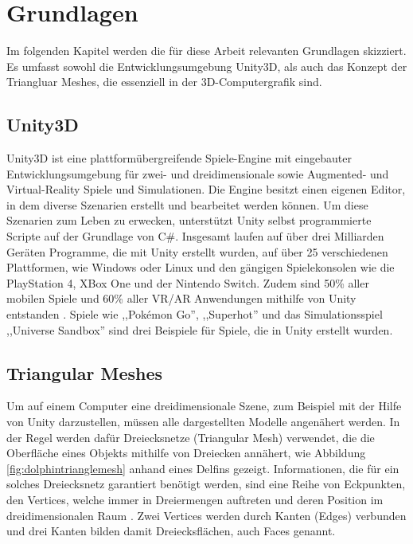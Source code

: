 \section{Grundlagen}
Im folgenden Kapitel werden die f\"ur diese Arbeit relevanten Grundlagen skizziert. Es umfasst sowohl die Entwicklungsumgebung Unity3D, als auch das Konzept der Triangluar Meshes, die essenziell in der 3D-Computergrafik sind.

\subsection{Unity3D}
Unity3D ist eine plattform\"ubergreifende Spiele-Engine mit eingebauter Entwicklungsumgebung f\"ur zwei- und dreidimensionale sowie Augmented- und Virtual-Reality Spiele und Simulationen. Die Engine besitzt einen eigenen Editor, in dem diverse Szenarien erstellt und bearbeitet werden k\"onnen. Um diese Szenarien zum Leben zu erwecken, unterst\"utzt Unity selbst programmierte Scripte auf der Grundlage von C\#. Insgesamt laufen auf \"uber drei Milliarden Ger\"aten Programme, die mit Unity erstellt wurden, auf \"uber 25 verschiedenen Plattformen, wie Windows oder Linux und den g\"angigen Spielekonsolen wie die PlayStation 4, XBox One und der Nintendo Switch. Zudem sind 50\% aller mobilen Spiele und 60\% aller VR/AR Anwendungen mithilfe von Unity entstanden \cite{Unity}. Spiele wie ,,Pok\'emon Go'', ,,Superhot'' und das Simulationsspiel ,,Universe Sandbox'' sind drei Beispiele f\"ur Spiele, die in Unity erstellt wurden.

\subsection{Triangular Meshes}
Um auf einem Computer eine dreidimensionale Szene, zum Beispiel mit der Hilfe von Unity darzustellen, m\"ussen alle dargestellten Modelle angen\"ahert werden. In der Regel werden daf\"ur Dreiecksnetze (Triangular Mesh) verwendet, die die Oberfl\"ache eines Objekts mithilfe von Dreiecken ann\"ahert, wie Abbildung \ref{fig:dolphintrianglemesh} anhand eines Delfins gezeigt. Informationen, die f\"ur ein solches Dreiecksnetz garantiert ben\"otigt werden, sind eine Reihe von Eckpunkten, den Vertices, welche immer in Dreiermengen auftreten und deren Position im dreidimensionalen Raum \cite[S.262]{Shirley2010}. Zwei Vertices werden durch Kanten (Edges) verbunden und drei Kanten bilden damit Dreiecksfl\"achen, auch Faces genannt.

